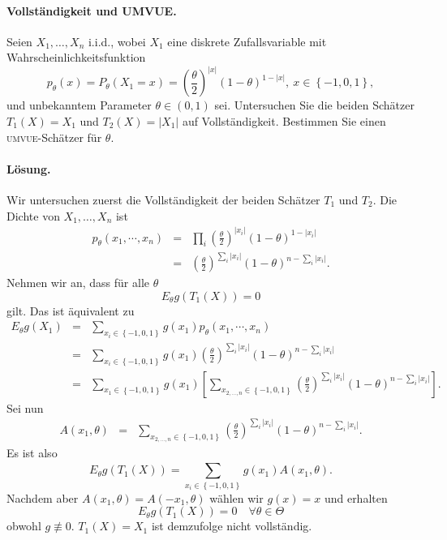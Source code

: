 \paragraph{Vollständigkeit und UMVUE. }  Seien $X_1,\ldots,X_n$ i.i.d.,
wobei $X_1$ eine diskrete Zufallsvariable mit Wahrscheinlichkeitsfunktion
\begin{equation*}
	p_\theta(x)=P_\theta(X_1=x)= 
	\left( \frac{\theta}{2} \right)^{|x|} (1-\theta)^{1-|x|},\  
	x\in\left\{ -1,0,1 \right\},
\end{equation*}
und unbekanntem Parameter $\theta\in (0,1)$ sei. Untersuchen Sie die beiden
Schätzer $T_1(X)=X_1$ und $T_2(X)=|X_1|$ auf Vollständigkeit. Bestimmen Sie
einen \textsc{umvue}-Schätzer für $\theta$.

\paragraph*{Lösung. } 
Wir untersuchen zuerst die Vollständigkeit der beiden Schätzer $T_1$ und $T_2$. 
Die Dichte von $X_1,\ldots,X_n$ ist
\begin{eqnarray}
	p_\theta(x_1, \cdots, x_n) &=& \prod_i \left( \frac{\theta}{2} \right)^{|x_i|} \left( 1-\theta \right)^{1-|x_i|} \\
	&=& \left( \frac{\theta}{2} \right)^{\sum_{i}^{} |x_i|} \left( 1-\theta \right)^{n-\sum_{i}^{} |x_i|}.
\end{eqnarray}
Nehmen wir an, dass für alle $\theta$
\begin{equation}
	E_\theta g\left( T_1\left( X \right) \right) = 0
\end{equation}
gilt. Das ist äquivalent zu 
\begin{eqnarray}
	E_\theta g\left( X_1 \right) &=&  \sum_{x_i\in\left\{ -1,0,1 \right\}}^{} g(x_1) p_\theta \left( x_1,\cdots,x_n \right) \\
	&=& \sum_{x_i\in\left\{ -1,0,1 \right\}}^{} g(x_1) \left( \frac{\theta}{2} \right)^{\sum_{i}^{} |x_i|} \left( 1-\theta \right)^{n-\sum_{i}^{} |x_i|} \\
	&=& \sum_{x_1\in\left\{ -1,0,1 \right\}}^{} g(x_1) \left[  \sum_{x_{2,\ldots,n}\in\left\{ -1,0,1 \right\}}^{}\left( \frac{\theta}{2} \right)^{\sum_{i}^{} |x_i|}\left( 1-\theta \right)^{n-\sum_{i}^{} |x_i|}   \right].
\end{eqnarray}
Sei nun
\begin{eqnarray}
	A(x_1, \theta) &=& \sum_{x_{2,\ldots,n}\in\left\{ -1,0,1 \right\}}^{}\left( \frac{\theta}{2} \right)^{\sum_{i}^{} |x_i|}\left( 1-\theta \right)^{n-\sum_{i}^{} |x_i|}.
\end{eqnarray}
Es ist also 
\begin{equation}
	E_\theta g\left( T_1\left( X \right) \right) = \sum_{x_i\in\left\{ -1,0,1 \right\}}^{} g(x_1) A\left( x_1, \theta \right).
\end{equation}
Nachdem aber $A\left( x_1,\theta \right) = A(-x_1,\theta)$ wählen wir $g\left( x \right)=x$ und erhalten
\begin{equation}
	E_\theta g\left( T_1\left( X \right) \right) = 0 \quad \forall \theta\in\Theta
\end{equation}
obwohl $g\nequiv 0$. $T_1(X)=X_1$ ist demzufolge nicht vollständig. 

